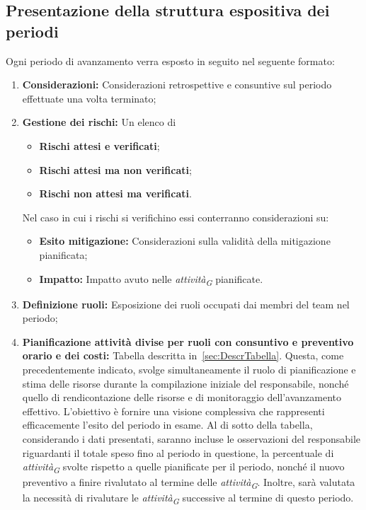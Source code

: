 \subsection{Presentazione della struttura espositiva dei periodi}
Ogni periodo di avanzamento verra esposto in seguito nel seguente formato:
\begin{enumerate}
    \item \textbf{Considerazioni:} Considerazioni retrospettive e consuntive sul periodo effettuate una volta terminato;
    \item \textbf{Gestione dei rischi:} Un elenco di 
            \begin{itemize}
                \item \textbf{Rischi attesi e verificati};
                \item \textbf{Rischi attesi ma non verificati};
                \item \textbf{Rischi non attesi ma verificati}.
            \end{itemize}
        Nel caso in cui i rischi si verifichino essi conterranno considerazioni su:
        \begin{itemize}
            \item \textbf{Esito mitigazione:} Considerazioni sulla validità della mitigazione pianificata;
            \item \textbf{Impatto:} Impatto avuto nelle \textit{attività}\textsubscript{\textit{G}} pianificate.
        \end{itemize}
    \item \textbf{Definizione ruoli:} Esposizione dei ruoli occupati dai membri del team nel periodo;
    \item \textbf{Pianificazione attività divise per ruoli con consuntivo e preventivo orario e dei costi:} Tabella descritta in~\ref{sec:DescrTabella}.
    Questa, come precedentemente indicato, svolge simultaneamente il ruolo di pianificazione e stima delle risorse durante la compilazione iniziale del responsabile, nonché quello di rendicontazione delle risorse e di monitoraggio dell'avanzamento effettivo. L'obiettivo è fornire una visione complessiva che rappresenti efficacemente l'esito del periodo in esame.
    Al di sotto della tabella, considerando i dati presentati, saranno incluse le osservazioni del responsabile riguardanti il totale speso fino al periodo in questione, la percentuale di \textit{attività}\textsubscript{\textit{G}} svolte rispetto a quelle pianificate per il periodo, nonché il nuovo preventivo a finire rivalutato al termine delle \textit{attività}\textsubscript{\textit{G}}. Inoltre, sarà valutata la necessità di rivalutare le \textit{attività}\textsubscript{\textit{G}} successive al termine di questo periodo.

\end{enumerate}
